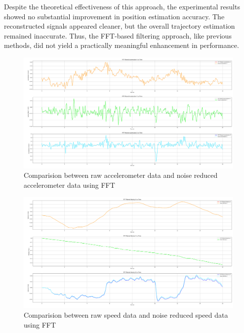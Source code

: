 \documentclass{article}
\begin{document}
Despite the theoretical effectiveness of this approach, the experimental results showed no substantial improvement in position estimation accuracy. The reconstructed signals appeared cleaner, but the overall trajectory estimation remained inaccurate. Thus, the FFT-based filtering approach, like previous methods, did not yield a practically meaningful enhancement in performance.
\FloatBarrier
\begin{figure}[h]
    \centering
    \includegraphics[width=\textwidth]{2_1_9_1.png}
    \caption{Comparision between raw accelerometer data and noise reduced accelerometer data using FFT}
    \label{fig:accel_fft}
\end{figure}
\FloatBarrier
\begin{figure}[h]
    \centering
    \includegraphics[width=\textwidth]{2_1_9_2.png}
    \caption{Comparision between raw speed data and noise reduced speed data using FFT}
    \label{fig:speed_fft}
\end{figure}
\FloatBarrier
\end{document}
